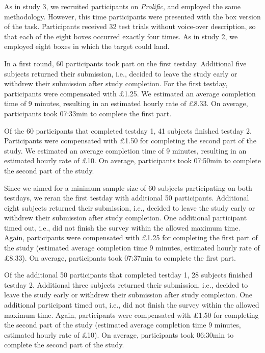 \documentclass[
  man,floatsintext]{apa6}
\begin{document}
As in study 3, we recruited participants on \emph{Prolific}, and employed the same methodology.
However, this time participants were presented with the box version of the task.
Participants received 32 test trials without voice-over description, so that each of the eight boxes occurred exactly four times.
As in study 2, we employed eight boxes in which the target could land.

In a first round, 60 participants took part on the first testday.
Additional five subjects returned their submission, i.e., decided to leave the study early or withdrew their submission after study completion.
For the first testday, participants were compensated with £1.25.
We estimated an average completion time of 9 minutes, resulting in an estimated hourly rate of £8.33.
On average, participants took 07:33min to complete the first part.

Of the 60 participants that completed testday 1, 41 subjects finished testday 2.
Participants were compensated with £1.50 for completing the second part of the study.
We estimated an average completion time of 9 minutes, resulting in an estimated hourly rate of £10.
On average, participants took 07:50min to complete the second part of the study.

Since we aimed for a minimum sample size of 60 subjects participating on both testdays, we reran the first testday with additional 50 participants.
Additional eight subjects returned their submission, i.e., decided to leave the study early or withdrew their submission after study completion.
One additional participant timed out, i.e., did not finish the survey within the allowed maximum time.
Again, participants were compensated with £1.25 for completing the first part of the study (estimated average completion time 9 minutes, estimated hourly rate of £8.33).
On average, participants took 07:37min to complete the first part.

Of the additional 50 participants that completed testday 1, 28 subjects finished testday 2.
Additional three subjects returned their submission, i.e., decided to leave the study early or withdrew their submission after study completion.
One additional participant timed out, i.e., did not finish the survey within the allowed maximum time.
Again, participants were compensated with £1.50 for completing the second part of the study (estimated average completion time 9 minutes, estimated hourly rate of £10).
On average, participants took 06:30min to complete the second part of the study.

\newpage
\end{document}
